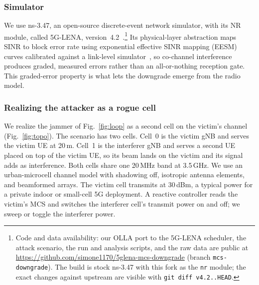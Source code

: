 \documentclass[conference]{IEEEtran}
\begin{document}
\subsubsection{Simulator}
We use ns-3.47, an open-source discrete-event network simulator, with its NR
module, called 5G-LENA, version~4.2~\cite{patriciello2019e2e}.\footnote{Code and
data availability: our OLLA port to the 5G-LENA scheduler, the attack scenario, the
run and analysis scripts, and the raw data are public at
\url{https://github.com/simone1170/5glena-mcs-downgrade} (branch \texttt{mcs-downgrade}).
The build is stock ns-3.47 with this fork as the \texttt{nr} module; the exact changes
against upstream are visible with \texttt{git diff v4.2..HEAD}.} Its physical-layer
abstraction maps SINR to block error rate using exponential effective SINR mapping (EESM)
curves calibrated against a
link-level simulator~\cite{lagen2020abstraction}, so co-channel interference produces
graded, measured errors rather than an all-or-nothing reception gate. This graded-error
property is what lets the downgrade emerge from the radio model.

\subsubsection{Realizing the attacker as a rogue cell}
We realize the jammer of Fig.~\ref{fig:loop} as a second cell on the victim's channel
(Fig.~\ref{fig:topo}). The scenario has two cells. Cell~0 is the victim gNB and serves
the victim UE at 20\,m. Cell~1 is the interferer gNB and serves a second UE placed on top
of the victim UE, so its beam lands on the victim and its signal adds as interference.
Both cells share one 20\,MHz band at 3.5\,GHz. We use an urban-microcell channel model
with shadowing off, isotropic antenna elements, and beamformed arrays. The victim cell
transmits at 30\,dBm, a typical power for a private indoor or small-cell 5G deployment.
A reactive controller reads the victim's MCS and switches the interferer cell's transmit
power on and off; we sweep or toggle the interferer power.
\end{document}
